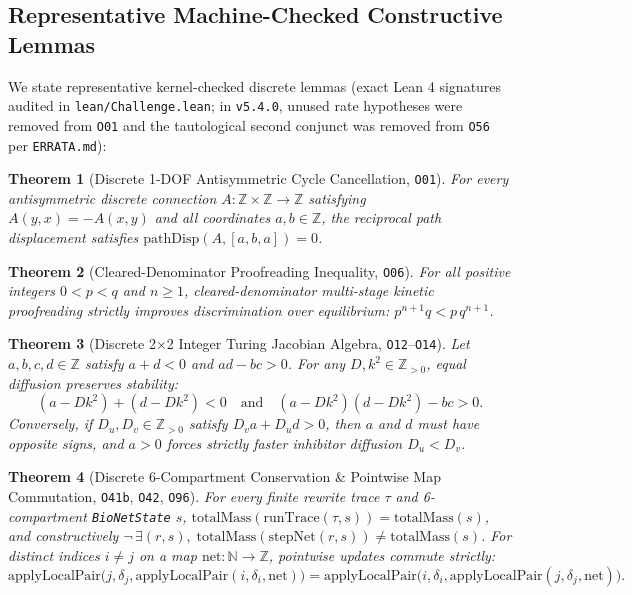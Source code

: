 \documentclass[11pt,reqno]{amsart}
\newtheorem{theorem}{Theorem}[section]
\begin{document}
\subsection{Representative Machine-Checked Constructive Lemmas}
We state representative kernel-checked discrete lemmas (exact Lean 4 signatures audited in \nolinkurl{lean/Challenge.lean}; in \texttt{v5.4.0}, unused rate hypotheses were removed from \texttt{O01} and the tautological second conjunct was removed from \texttt{O56} per \nolinkurl{ERRATA.md}):

\begin{theorem}[Discrete 1-DOF Antisymmetric Cycle Cancellation, \texttt{O01}]
For every antisymmetric discrete connection $A : \mathbb{Z} \times \mathbb{Z} \to \mathbb{Z}$ satisfying $A(y,x) = -A(x,y)$ and all coordinates $a,b \in \mathbb{Z}$, the reciprocal path displacement satisfies $\mathrm{pathDisp}(A, [a,b,a]) = 0$.
\end{theorem}

\begin{theorem}[Cleared-Denominator Proofreading Inequality, \texttt{O06}]
For all positive integers $0 < p < q$ and $n \ge 1$, cleared-denominator multi-stage kinetic proofreading strictly improves discrimination over equilibrium: $p^{n+1} q < p\,q^{n+1}$.
\end{theorem}

\begin{theorem}[Discrete 2$\times$2 Integer Turing Jacobian Algebra, \texttt{O12}--\texttt{O14}]
Let $a,b,c,d \in \mathbb{Z}$ satisfy $a+d < 0$ and $ad-bc > 0$. For any $D, k^2 \in \mathbb{Z}_{>0}$, equal diffusion preserves stability:
\[
  (a - Dk^2) + (d - Dk^2) < 0 \quad\text{and}\quad (a - Dk^2)(d - Dk^2) - bc > 0.
\]
Conversely, if $D_u, D_v \in \mathbb{Z}_{>0}$ satisfy $D_v a + D_u d > 0$, then $a$ and $d$ must have opposite signs, and $a > 0$ forces strictly faster inhibitor diffusion $D_u < D_v$.
\end{theorem}

\begin{theorem}[Discrete 6-Compartment Conservation \& Pointwise Map Commutation, \texttt{O41b}, \texttt{O42}, \texttt{O96}]
For every finite rewrite trace $\tau$ and 6-compartment \texttt{BioNetState} $s$, $\mathrm{totalMass}(\mathrm{runTrace}(\tau, s)) = \mathrm{totalMass}(s)$, and constructively $\neg\,\exists(r,s),\;\mathrm{totalMass}(\mathrm{stepNet}(r,s)) \ne \mathrm{totalMass}(s)$. For distinct indices $i \ne j$ on a map $\mathrm{net} : \mathbb{N} \to \mathbb{Z}$, pointwise updates commute strictly:
\[
  \mathrm{applyLocalPair}\bigl(j,\delta_j,\mathrm{applyLocalPair}(i,\delta_i,\mathrm{net})\bigr)
  = \mathrm{applyLocalPair}\bigl(i,\delta_i,\mathrm{applyLocalPair}(j,\delta_j,\mathrm{net})\bigr).
\]
\end{theorem}
\end{document}

